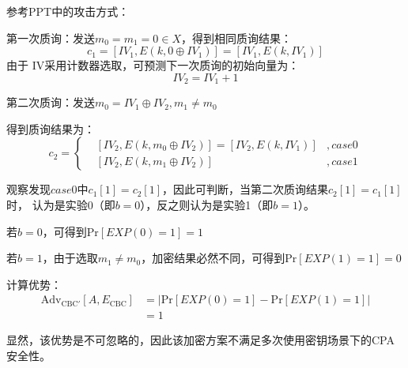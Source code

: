 \begin{Solution}
    参考PPT中的攻击方式：

    第一次质询：发送$m_0=m_1=0\in X$，得到相同质询结果：
    \begin{equation}
        c_1 = [IV_1, E(k, 0\oplus IV_1)] = [IV_1, E(k, IV_1)]
    \end{equation}
    由于 IV采用计数器选取，可预测下一次质询的初始向量为：
    \begin{equation}
        IV_2 = IV_1 + 1
    \end{equation}

    第二次质询：发送$m_0 = IV_1 \oplus IV_2, m_1 \neq m_0$

    得到质询结果为：
    \begin{equation}
        c_2 = \left\{
        \begin{aligned}
            &[IV_2, E(k,m_0 \oplus IV_2)] = [IV_2, E(k, IV_1)] &, case0\\
            &[IV_2, E(k,m_1\oplus IV_2)]    &,case1
        \end{aligned}
        \right.
    \end{equation}

    观察发现$case0$中$c_1[1] = c_2[1]$，因此可判断，当第二次质询结果$c_2[1]=c_1[1]$时，
    认为是实验0（即$b=0$），反之则认为是实验1（即$b=1$）。

    若$b=0$，可得到$\mathrm{Pr}[EXP(0)=1] = 1$

    若$b=1$，由于选取$m_1 \neq m_0$，加密结果必然不同，可得到$\mathrm{Pr}[EXP(1)=1] = 0$

    计算优势：
    \begin{equation}
        \begin{aligned}
            \mathrm{Adv_{CBC'}}[A, E_{\mathrm{CBC}}]    &= |\mathrm{Pr}[EXP(0)=1] - \mathrm{Pr}[EXP(1)=1]|\\
                                        &= 1
        \end{aligned}
    \end{equation}

    显然，该优势是不可忽略的，因此该加密方案不满足多次使用密钥场景下的CPA安全性。
    
\end{Solution}